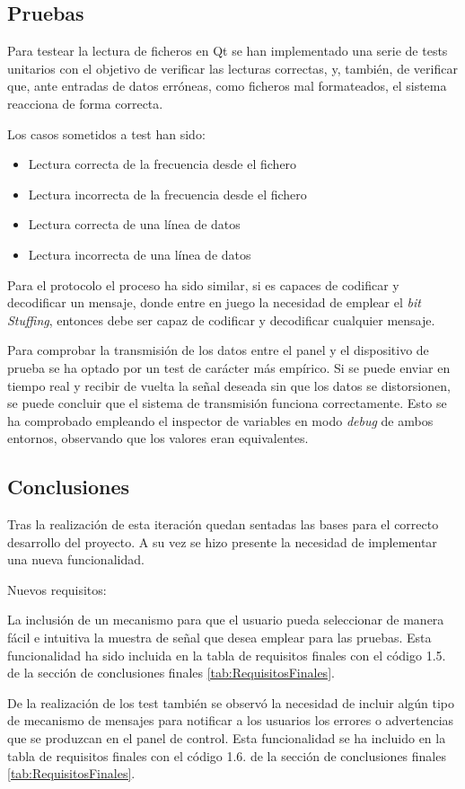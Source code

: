    \subsection{Pruebas}

        Para testear la lectura de ficheros en Qt se han implementado una serie de tests unitarios con el objetivo de verificar las lecturas correctas, y, también, de verificar que, ante entradas de datos erróneas, como ficheros mal formateados, el sistema reacciona de forma correcta.

        Los casos sometidos a test han sido:

        \begin{itemize}
                \item Lectura correcta de la frecuencia desde el fichero
                \item Lectura incorrecta de la frecuencia desde el fichero
                \item Lectura correcta de una línea de datos
                \item Lectura incorrecta de una línea de datos
        \end{itemize}

        Para el protocolo el proceso ha sido similar, si es capaces de codificar y decodificar un mensaje, donde entre en juego la necesidad de emplear el \textit{bit Stuffing}, entonces debe ser capaz de codificar y decodificar cualquier mensaje.

        Para comprobar la transmisión de los datos entre el panel y el dispositivo de prueba se ha optado por un test de carácter más empírico. Si se puede enviar en tiempo real y recibir de vuelta la señal deseada sin que los datos se distorsionen, se puede concluir que el sistema de transmisión funciona correctamente. Esto se ha comprobado empleando el inspector de variables en modo \textit{debug} de ambos entornos, observando que los valores eran equivalentes.

    \subsection{Conclusiones}

        Tras la realización de esta iteración quedan sentadas las bases para el correcto desarrollo del proyecto. A su vez se hizo presente la necesidad de implementar una nueva funcionalidad.

        Nuevos requisitos:

        La inclusión de un mecanismo para que el usuario pueda seleccionar de manera fácil e intuitiva la muestra de señal que desea emplear para las pruebas. Esta funcionalidad ha sido incluida en la tabla de requisitos finales con el código 1.5. de la sección de conclusiones finales \ref{tab:RequisitosFinales}.

        De la realización de los test también se observó la necesidad de incluir algún tipo de mecanismo de mensajes para notificar a los usuarios los errores o advertencias que se produzcan en el panel de control. Esta funcionalidad se ha incluido en la tabla de requisitos finales con el código 1.6. de la sección de conclusiones finales \ref{tab:RequisitosFinales}. 
        